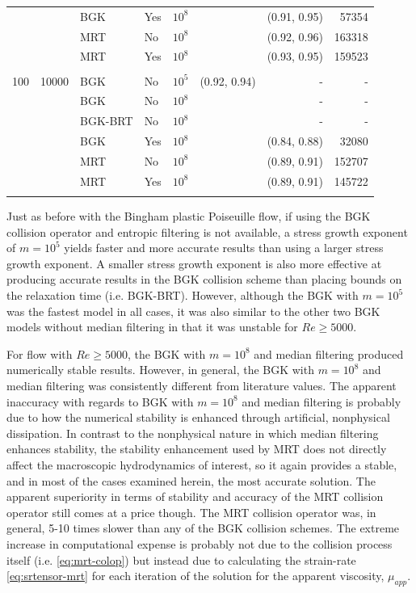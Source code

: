 \begin{table}
\begin{tabulary}{\linewidth}{r r l l r r r r}
    &      & BGK     & Yes & $10^8$ &              & (0.91, 0.95) & 57354 \\
    &      & MRT     & No  & $10^8$ &              & (0.92, 0.96) & 163318 \\
    &      & MRT     & Yes & $10^8$ &              & (0.93, 0.95) & 159523 \\
\\
100 & 10000 & BGK     & No  & $10^5$ & (0.92, 0.94) & - & - \\
    &       & BGK     & No  & $10^8$ &              & - & - \\
    &       & BGK-BRT & No  & $10^8$ &              & - & - \\
    &       & BGK     & Yes & $10^8$ &              & (0.84, 0.88) & 32080 \\
    &       & MRT     & No  & $10^8$ &              & (0.89, 0.91) & 152707 \\
    &       & MRT     & Yes & $10^8$ &              & (0.89, 0.91) & 145722 \\
\\
\end{tabulary}
\label{tab:lid-bing100}
\end{table}

Just as before with the Bingham plastic Poiseuille flow, if using the BGK collision operator and entropic filtering is not available, a stress growth exponent of $m = 10^5$ yields faster and more accurate results than using a larger stress growth exponent.
A smaller stress growth exponent is also more effective at producing accurate results in the BGK collision scheme than placing bounds on the relaxation time (i.e. BGK-BRT).
However, although the BGK with $m = 10^5$ was the fastest model in all cases, it was also similar to the other two BGK models without median filtering in that it was unstable for $Re \ge 5000$.

For flow with $Re \ge 5000$, the BGK with $m = 10^8$ and median filtering produced numerically stable results.
However, in general, the BGK with $m = 10^8$ and median filtering was consistently different from literature values. 
The apparent inaccuracy with regards to BGK with $m = 10^8$ and median filtering is probably due to how the numerical stability is enhanced through artificial, nonphysical dissipation.
In contrast to the nonphysical nature in which median filtering enhances stability, the stability enhancement used by MRT does not directly affect the macroscopic hydrodynamics of interest, so it again provides a stable, and in most of the cases examined herein, the most accurate solution. %
The apparent superiority in terms of stability and accuracy of the MRT collision operator still comes at a price though.
The MRT collision operator was, in general, 5-10 times slower than any of the BGK collision schemes.
The extreme increase in computational expense is probably not due to the collision process itself (i.e. \eqref{eq:mrt-colop}) but instead due to calculating the strain-rate \eqref{eq:srtensor-mrt} for each iteration of the solution for the apparent viscosity, $\mu_{app}$.

